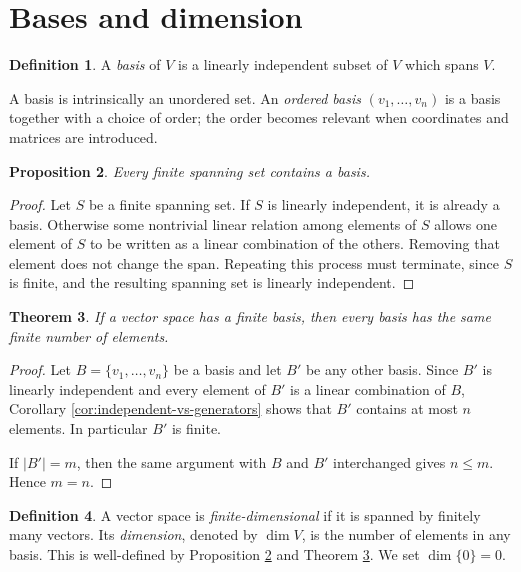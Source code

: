 \documentclass{amsbook}
\newtheorem{theorem}{Theorem}[chapter]
\newtheorem{proposition}[theorem]{Proposition}
\theoremstyle{definition}
\newtheorem{definition}[theorem]{Definition}
\theoremstyle{remark}
\numberwithin{section}{chapter}
\numberwithin{equation}{chapter}
\begin{document}
\section{Bases and dimension}

\begin{definition}
	A \emph{basis} of $V$ is a linearly independent subset of $V$ which spans $V$.
\end{definition}

A basis is intrinsically an unordered set. An \emph{ordered basis} $(v_1,\dots,v_n)$ is a basis together with a choice of order; the order becomes relevant when coordinates and matrices are introduced.

\begin{proposition}\label{prop:finite-spanning-basis}
	Every finite spanning set contains a basis.
\end{proposition}

\begin{proof}
	Let $S$ be a finite spanning set. If $S$ is linearly independent, it is already a basis. Otherwise some nontrivial linear relation among elements of $S$ allows one element of $S$ to be written as a linear combination of the others. Removing that element does not change the span. Repeating this process must terminate, since $S$ is finite, and the resulting spanning set is linearly independent.
\end{proof}

\begin{theorem}\label{thm:basis-cardinality}
	If a vector space has a finite basis, then every basis has the same finite number of elements.
\end{theorem}

\begin{proof}
	Let $B=\{v_1,\dots,v_n\}$ be a basis and let $B'$ be any other basis. Since $B'$ is linearly independent and every element of $B'$ is a linear combination of $B$, Corollary \ref{cor:independent-vs-generators} shows that $B'$ contains at most $n$ elements. In particular $B'$ is finite.

	If $|B'|=m$, then the same argument with $B$ and $B'$ interchanged gives $n\le m$. Hence $m=n$.
\end{proof}

\begin{definition}
	A vector space is \emph{finite-dimensional} if it is spanned by finitely many vectors. Its \emph{dimension}, denoted by $\dim V$, is the number of elements in any basis. This is well-defined by Proposition \ref{prop:finite-spanning-basis} and Theorem \ref{thm:basis-cardinality}. We set $\dim\{0\}=0$.
\end{definition}
\end{document}
